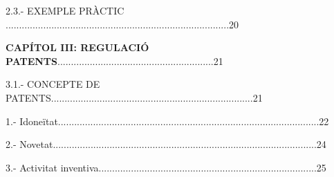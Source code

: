 \documentclass[12pt]{article}
\begin{document}
\vspace{\baselineskip}
\begin{justify}
2.3.- EXEMPLE PRÀCTIC ...................................................................................20
\end{justify}\par


\vspace{\baselineskip}

\vspace{\baselineskip}
\begin{justify}
\textbf{CAPÍTOL III: REGULACIÓ PATENTS}..........................................................21
\end{justify}\par


\vspace{\baselineskip}

\vspace{\baselineskip}
\begin{justify}
3.1.- CONCEPTE DE PATENTS...........................................................................21
\end{justify}\par


\vspace{\baselineskip}

\vspace{\baselineskip}
\begin{adjustwidth}{0.49in}{0.0in}
\begin{justify}
1.- Idoneïtat.................................................................................................22
\end{justify}\par

\end{adjustwidth}


\vspace{\baselineskip}
\begin{adjustwidth}{0.49in}{0.0in}
\begin{justify}
2.- Novetat..................................................................................................24
\end{justify}\par

\end{adjustwidth}


\vspace{\baselineskip}
\begin{adjustwidth}{0.49in}{0.0in}
\begin{justify}
3.- Activitat inventiva.................................................................................25
\end{justify}\par

\end{adjustwidth}
\end{document}
